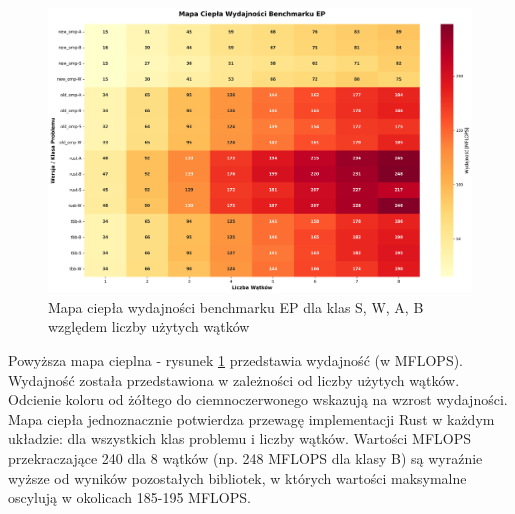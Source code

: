 \begin{figure}[H]
    \centering
    \includegraphics[width=\textwidth]{analiza/images/parallel/ep/arm/ep_mapa_ciepla_wydajnosci.png}
    \caption{Mapa ciepła wydajności benchmarku EP dla klas S, W, A, B względem liczby użytych wątków}
    \label{ep_heatmap_wydajnosci}
\end{figure}
Powyższa mapa cieplna - rysunek \ref{ep_heatmap_wydajnosci} przedstawia wydajność (w MFLOPS). Wydajność została przedstawiona w zależności od liczby użytych wątków. Odcienie koloru od żółtego do ciemnoczerwonego wskazują na wzrost wydajności.\\
Mapa ciepła jednoznacznie potwierdza przewagę implementacji Rust w każdym układzie: dla wszystkich klas problemu i liczby wątków. Wartości MFLOPS przekraczające 240 dla 8 wątków (np. 248 MFLOPS dla klasy B) są wyraźnie wyższe od wyników pozostałych bibliotek, w których wartości maksymalne oscylują w okolicach 185-195 MFLOPS.



